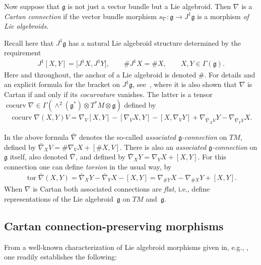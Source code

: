\documentclass[11pt]{article}
\DeclareMathOperator{\cocurvature}{cocurv}
\DeclareMathOperator{\torsion}{tor}
\numberwithin{equation}{section}
\begin{document}
Now suppose that $\mathfrak g$ is not just a vector bundle but a Lie
algebroid. Then $\nabla$ is a {\it Cartan connection} if the vector
bundle morphism $s_\nabla \colon {\mathfrak g} \rightarrow
J^1{\mathfrak g}$ is a morphism {\em of Lie algebroids}.

Recall here that $J^1 {\mathfrak g}$ has a natural Lie algebroid
structure determined by the requirement
\begin{gather*}
  J^1[X,Y]=\big[J^1 X,J^1 Y\big],\qquad \# J^1 X = \# X, \qquad X,Y\in\Gamma({\mathfrak g}).%
\end{gather*}
Here and throughout, the anchor of a Lie algebroid is denoted
$\#$. For details and an explicit formula for the bracket on $J^1
{\mathfrak g} $, see~\cite{Blaom_05}, where it is also shown that
$\nabla$ is Cartan if and only if its {\it cocurvature} vanishes. The
latter is a tensor $\cocurvature \nabla \in \Gamma(\wedge^2({\mathfrak
  g}^*)\otimes T^*\!M \otimes {\mathfrak g} )$ def\/ined by
\begin{gather*}
    \cocurvature\nabla ( X, Y)V=\nabla_V[X, Y]-[\nabla_VX,
    Y]-[X,\nabla_VY] +\nabla_{\bar\nabla_XV}Y-\nabla_{\bar\nabla_YV}X.
\end{gather*}

In the above formula $\bar\nabla$ denotes the so-called {\it
  associated ${\mathfrak g}$-connection} on $TM$, def\/ined by
$\bar\nabla_XV=\#\nabla_VX +[\#X,V]$. There is also an {\it associated
  ${\mathfrak g}$-connection} on $\mathfrak g$ itself, also denoted
$\bar\nabla$, and def\/ined by $\bar\nabla_XY=\nabla_YX+[X,Y]$. For this
connection one can def\/ine {\it torsion} in the usual way, by
\begin{gather*}
  \torsion \bar\nabla (X,Y) =
  \bar\nabla_XY-\bar\nabla_YX-[X,Y]=\nabla_{\#Y}X-\nabla_{\#X}Y+[X,Y].
\end{gather*}
When $\nabla $ is Cartan both associated connections are {\em flat},
i.e., def\/ine representations of the Lie algebroid~$\mathfrak g$ on
$TM$ and~${\mathfrak g} $.

\subsection{Cartan connection-preserving morphisms}\label{preserve}

From a well-known characterization of Lie algebroid morphisms given
in, e.g., \cite[Proposition~4.3.12]{Mackenzie_05}, one readily
establishes the following:
\end{document}
